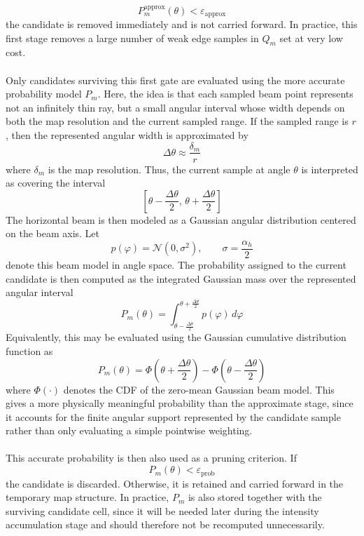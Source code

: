$$
    P_m^{\mathrm{approx}}(\theta) < \varepsilon_{\mathrm{approx}}
$$
the candidate is removed immediately and is not carried forward. In practice, this first stage removes a large number of weak edge samples in $Q_m$ set at very low cost.
\\ \\
Only candidates surviving this first gate are evaluated using the more accurate probability model $P_m$. Here, the idea is that each sampled beam point represents not an infinitely thin ray, but a small angular interval whose width depends on both the map resolution and the current sampled range. If the sampled range is $r$, then the represented angular width is approximated by
$$
    \Delta \theta \approx \frac{\delta_m}{r}
$$
where $\delta_m$ is the map resolution. Thus, the current sample at angle $\theta$ is interpreted as covering the interval
$$
    \left[\theta - \frac{\Delta\theta}{2}, \, \theta + \frac{\Delta\theta}{2}\right]
$$
The horizontal beam is then modeled as a Gaussian angular distribution centered on the beam axis. Let
$$
    p(\varphi) = \mathcal{N}(0,\sigma^2),
    \qquad
    \sigma = \frac{\alpha_h}{2}
$$
denote this beam model in angle space. The probability assigned to the current candidate is then computed as the integrated Gaussian mass over the represented angular interval
$$
    P_m(\theta) =
    \int_{\theta - \frac{\Delta\theta}{2}}^{\theta + \frac{\Delta\theta}{2}} p(\varphi)\, d\varphi
$$
Equivalently, this may be evaluated using the Gaussian cumulative distribution function as
\begin{equation}
    P_m(\theta) =
    \Phi\!\left(\theta + \frac{\Delta\theta}{2}\right)
    -
    \Phi\!\left(\theta - \frac{\Delta\theta}{2}\right)
    \label{eq:local-map-generation-pm}
\end{equation}
where $\Phi(\cdot)$ denotes the CDF of the zero-mean Gaussian beam model. This gives a more physically meaningful probability than the approximate stage, since it accounts for the finite angular support represented by the candidate sample rather than only evaluating a simple pointwise weighting.
\\ \\
This accurate probability is then also used as a pruning criterion. If
$$
    P_m(\theta) < \varepsilon_{\mathrm{prob}}
$$
the candidate is discarded. Otherwise, it is retained and carried forward in the temporary map structure. In practice, $P_m$ is also stored together with the surviving candidate cell, since it will be needed later during the intensity accumulation stage and should therefore not be recomputed unnecessarily.
